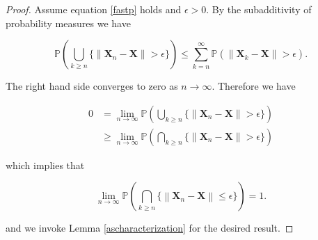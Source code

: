 \documentclass[11pt] {article}
\newcommand{\norm}[1]{\left\lVert#1\right\rVert}
\newcommand{\X}{\pmb{X}}
\begin{document}
\begin{proof}
	Assume equation \eqref{fastp} holds and $\epsilon > 0$. By the subadditivity of probability measures we have
	
	\begin{equation*}
	\mathbb{P}\left(\bigcup_{k\geq n}\{\norm{\X_n-\X} > \epsilon\}\right) \leq \sum_{k=n}^{\infty} \mathbb{P}(\norm{\X_k-\X}>\epsilon).
	\end{equation*}
	
	The right hand side converges to zero as $n\to\infty$. Therefore we have 
	
	\begin{align*}
	0 &= \lim_{n\to\infty}\mathbb{P}\left(\bigcup_{k\geq n}\{\norm{\X_n-\X} > \epsilon\}\right) \\
	&\geq \lim_{n\to\infty}\mathbb{P}\left(\bigcap_{k\geq n}\{\norm{\X_n-\X} > \epsilon\}\right)
	\end{align*}
	
	which implies that
	
	\begin{equation*} \lim_{n\to\infty}\mathbb{P}\left(\bigcap_{k\geq n}\{\norm{\X_n-\X} \leq \epsilon\}\right) = 1.
	\end{equation*}
	
	and we invoke Lemma \ref{ascharacterization} for the desired result. 
\end{proof}








\end{document}
